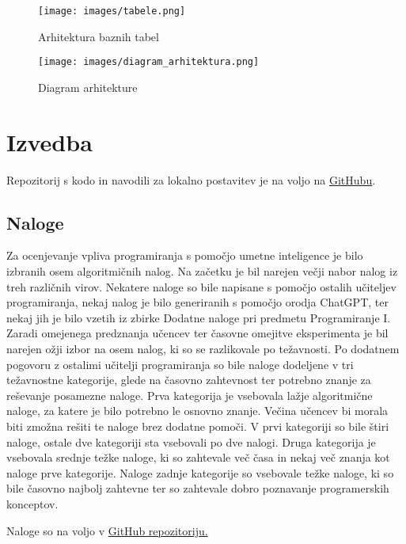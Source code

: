 \documentclass[a4paper,12pt,openright]{book}
\begin{document}
\begin{figure}[H]
    \centering
    \texttt{[image: images/tabele.png]}
    \caption{Arhitektura baznih tabel}
    \label{fig:enter-label}
\end{figure}

\begin{figure}[H]
    \centering
    \texttt{[image: images/diagram\_arhitektura.png]}
    \caption{Diagram arhitekture}
    \label{fig:enter-label}
\end{figure}
\section{Izvedba}

Repozitorij s kodo in navodili za lokalno postavitev je na voljo na \href{https://github.com/spin311/hiter-inzeniring-diploma}{GitHubu}. 

\subsection{Naloge}
Za ocenjevanje vpliva programiranja s pomočjo umetne inteligence je bilo izbranih osem algoritmičnih nalog.
Na začetku je bil narejen večji nabor nalog iz treh različnih virov. Nekatere naloge so bile napisane s pomočjo ostalih učiteljev programiranja, nekaj nalog je bilo generiranih s pomočjo orodja ChatGPT, ter nekaj jih je bilo vzetih iz zbirke Dodatne naloge pri predmetu Programiranje I. \cite{dodatneNaloge}
Zaradi omejenega predznanja učencev ter časovne omejitve eksperimenta je bil narejen ožji izbor na osem nalog, ki so se razlikovale po težavnosti. Po dodatnem pogovoru z ostalimi učitelji programiranja so bile naloge dodeljene v tri težavnostne kategorije, glede na časovno zahtevnost ter potrebno znanje za reševanje posamezne naloge. Prva kategorija je vsebovala lažje algoritmične naloge, za katere je bilo potrebno le osnovno znanje. Večina učencev bi morala biti zmožna rešiti te naloge brez dodatne pomoči. V prvi kategoriji so bile štiri naloge, ostale dve kategoriji sta vsebovali po dve nalogi. Druga kategorija je vsebovala srednje težke naloge, ki so zahtevale več časa  in nekaj več znanja kot naloge prve kategorije. Naloge zadnje kategorije so vsebovale težke naloge, ki so bile časovno najbolj zahtevne ter so zahtevale dobro poznavanje programerskih konceptov.  


Naloge so na voljo v  \href{https://github.com/spin311/hiter-inzeniring-diploma/tree/main/naloge}{GitHub repozitoriju.}
\end{document}

